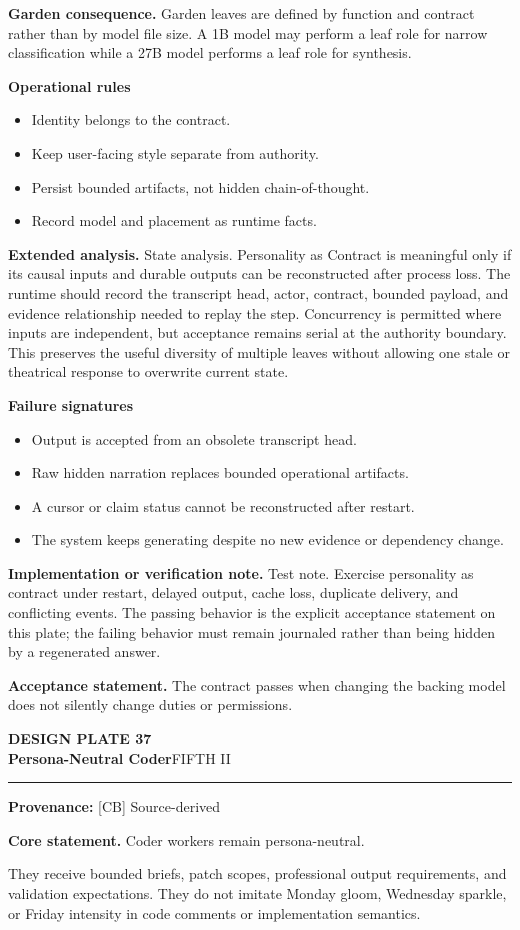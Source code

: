 \documentclass[10pt,letterpaper,oneside]{article}
\newcommand{\prov}[1]{\textcolor{gardenBlue}{\sffamily\footnotesize\textbf{Provenance:} #1}}
\newcommand{\platetitle}[3]{%
  \begin{minipage}[t][0.54in][t]{\textwidth}
  {\sffamily\bfseries\color{gardenDeep}\fontsize{9}{10}\selectfont DESIGN PLATE #1}\\[-1pt]
  {\sffamily\bfseries\color{gardenInk}\fontsize{16.5}{18}\selectfont #2}\hfill{\sffamily\color{gardenGreen}\large #3}
  \end{minipage}\vspace{-2pt}\hrule\vspace{5pt}}
\begin{document}
\textbf{Garden consequence.} Garden leaves are defined by function and contract rather than by model file size. A 1B model may perform a leaf role for narrow classification while a 27B model performs a leaf role for synthesis.

\textbf{Operational rules}
\begin{itemize}
\item Identity belongs to the contract.
\item Keep user-facing style separate from authority.
\item Persist bounded artifacts, not hidden chain-of-thought.
\item Record model and placement as runtime facts.
\end{itemize}
\textbf{Extended analysis.} State analysis. Personality as Contract is meaningful only if its causal inputs and durable outputs can be reconstructed after process loss. The runtime should record the transcript head, actor, contract, bounded payload, and evidence relationship needed to replay the step. Concurrency is permitted where inputs are independent, but acceptance remains serial at the authority boundary. This preserves the useful diversity of multiple leaves without allowing one stale or theatrical response to overwrite current state.

\textbf{Failure signatures}
\begin{itemize}
\item Output is accepted from an obsolete transcript head.
\item Raw hidden narration replaces bounded operational artifacts.
\item A cursor or claim status cannot be reconstructed after restart.
\item The system keeps generating despite no new evidence or dependency change.
\end{itemize}
\textbf{Implementation or verification note.} Test note. Exercise personality as contract under restart, delayed output, cache loss, duplicate delivery, and conflicting events. The passing behavior is the explicit acceptance statement on this plate; the failing behavior must remain journaled rather than being hidden by a regenerated answer.

\begin{acceptbox}
\textbf{Acceptance statement.} The contract passes when changing the backing model does not silently change duties or permissions.
\end{acceptbox}
\newpage
\platetitle{37}{Persona-Neutral Coder}{FIFTH II}
\prov{[CB] Source-derived}
\fontsize{8.85}{10.45}\selectfont
\begin{corebox}
\textbf{Core statement.} Coder workers remain persona-neutral.
\end{corebox}
They receive bounded briefs, patch scopes, professional output requirements, and validation expectations. They do not imitate Monday gloom, Wednesday sparkle, or Friday intensity in code comments or implementation semantics.
\end{document}
